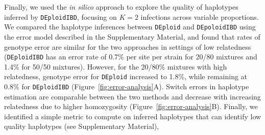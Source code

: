 \documentclass[9pt,lineno]{elife}
\begin{document}
Finally, we used the \emph{in silico} approach to explore the quality of haplotypes inferred by \texttt{DEploidIBD}, focusing on $K=2$ infections across variable proportions. We compared the haplotype inferences between \texttt{DEploid} and \texttt{DEpoloidIBD} using the error model described in the Supplementary Material, and found that rates of genotype error are similar for the two approaches in settings of low relatedness ({\tt DEploidIBD} has an error rate of 0.7\% per site per strain for 20/80 mixtures and 1.4\% for 50/50 mixtures).  However, for the 20/80\% mixtures with high relatedness, genotype error for \texttt{DEploid} increased to 1.8\%, while remaining at 0.8\% for \texttt{DEploidIBD} (Figure~\ref{fig:error-analysis}A). Switch errors in haplotype estimation are comparable between the two methods and decrease with increasing relatedness due to higher homozygosity (Figure~\ref{fig:error-analysis}B). Finally, we identified a simple metric to compute on inferred haplotypes that can identify low quality haplotypes (see Supplementary Material),
\end{document}
